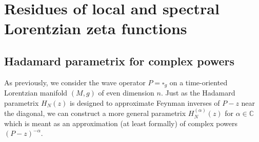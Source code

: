 \documentclass[JEP,XML,SOM,Unicode]{cedram}
\theoremstyle{definition}
\newcommand\cc{{\mathbb C}}
\let\cv\alpha
\begin{document}
\section{Residues of local and spectral Lorentzian zeta functions} \label{section5}

\subsection{Hadamard parametrix for complex powers} \label{ss:hc} As previously, we consider the wave operator $P=\square_g$ on a time-oriented Lorentzian manifold $(M,g)$ of even dimension $n$. Just as the Hadamard parametrix $H_N(z)$ is designed to approximate Feynman inverses of $P-z$ near the diagonal, we can construct a more general parametrix $H_N^{(\cv)}(z)$ for $\cv\in\cc$ which is meant as an approximation (at least formally) of complex powers $(P-z)^{-\cv}$.
\end{document}
